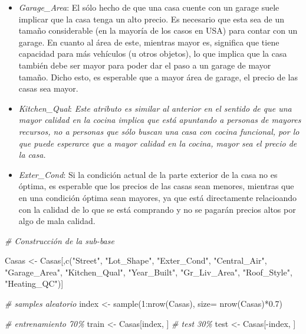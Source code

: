 \documentclass[
]{article}
\newenvironment{Shaded}{\begin{snugshade}}{\end{snugshade}}
\newcommand{\AttributeTok}[1]{\textcolor[rgb]{0.77,0.63,0.00}{#1}}
\newcommand{\CommentTok}[1]{\textcolor[rgb]{0.56,0.35,0.01}{\textit{#1}}}
\newcommand{\DecValTok}[1]{\textcolor[rgb]{0.00,0.00,0.81}{#1}}
\newcommand{\FloatTok}[1]{\textcolor[rgb]{0.00,0.00,0.81}{#1}}
\newcommand{\FunctionTok}[1]{\textcolor[rgb]{0.00,0.00,0.00}{#1}}
\newcommand{\NormalTok}[1]{#1}
\newcommand{\OtherTok}[1]{\textcolor[rgb]{0.56,0.35,0.01}{#1}}
\newcommand{\SpecialCharTok}[1]{\textcolor[rgb]{0.00,0.00,0.00}{#1}}
\newcommand{\StringTok}[1]{\textcolor[rgb]{0.31,0.60,0.02}{#1}}
\begin{document}
\begin{itemize}
\item
  \emph{Garage\_Area}: El sólo hecho de que una casa cuente con un
  garage suele implicar que la casa tenga un alto precio. Es necesario
  que esta sea de un tamaño considerable (en la mayoría de los casos en
  USA) para contar con un garage. En cuanto al área de este, mientras
  mayor es, significa que tiene capacidad para más vehículos (u otros
  objetos), lo que implica que la casa también debe ser mayor para poder
  dar el paso a un garage de mayor tamaño. Dicho esto, es esperable que
  a mayor área de garage, el precio de las casas sea mayor.
\item
  \emph{Kitchen\_Qual}: \emph{Este atributo es similar al anterior en el
  sentido de que una mayor calidad en la cocina implica que está
  apuntando a personas de mayores recursos, no a personas que sólo
  buscan una casa con cocina funcional, por lo que puede esperarce que a
  mayor calidad en la cocina, mayor sea el precio de la casa.}
\item
  \emph{Exter\_Cond}: Si la condición actual de la parte exterior de la
  casa no es óptima, es esperable que los precios de las casas sean
  menores, mientras que en una condición óptima sean mayores, ya que
  está directamente relacioando con la calidad de lo que se está
  comprando y no se pagarán precios altos por algo de mala calidad.
\end{itemize}

\begin{Shaded}
\begin{Highlighting}[]
\CommentTok{\# Construcción de la sub{-}base}

\NormalTok{Casas }\OtherTok{\textless{}{-}}\NormalTok{ Casas[,}\FunctionTok{c}\NormalTok{(}\StringTok{"Street"}\NormalTok{, }\StringTok{"Lot\_Shape"}\NormalTok{, }\StringTok{"Exter\_Cond"}\NormalTok{, }\StringTok{"Central\_Air"}\NormalTok{, }\StringTok{"Garage\_Area"}\NormalTok{, }\StringTok{"Kitchen\_Qual"}\NormalTok{, }\StringTok{"Year\_Built"}\NormalTok{, }\StringTok{"Gr\_Liv\_Area"}\NormalTok{, }\StringTok{"Roof\_Style"}\NormalTok{, }\StringTok{"Heating\_QC"}\NormalTok{)]}
\end{Highlighting}
\end{Shaded}

\begin{Shaded}
\begin{Highlighting}[]
\CommentTok{\# samples aleatorio}
\NormalTok{index }\OtherTok{\textless{}{-}} \FunctionTok{sample}\NormalTok{(}\DecValTok{1}\SpecialCharTok{:}\FunctionTok{nrow}\NormalTok{(Casas), }\AttributeTok{size=} \FunctionTok{nrow}\NormalTok{(Casas)}\SpecialCharTok{*}\FloatTok{0.7}\NormalTok{)}

\CommentTok{\# entrenamiento 70\%}
\NormalTok{train }\OtherTok{\textless{}{-}}\NormalTok{ Casas[index, ]}
\CommentTok{\# test 30\%}
\NormalTok{test  }\OtherTok{\textless{}{-}}\NormalTok{ Casas[}\SpecialCharTok{{-}}\NormalTok{index, ]}
\end{Highlighting}
\end{Shaded}
\end{document}
